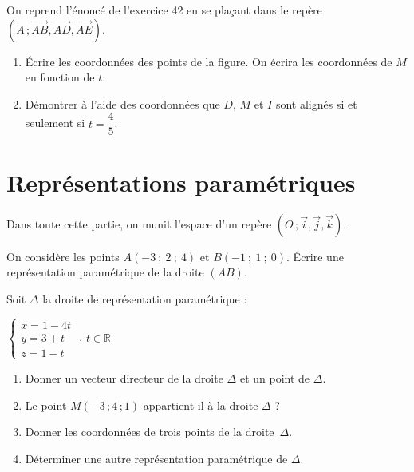 \documentclass{cornouaille}
\begin{document}
\begin{exercice}
  On reprend l'énoncé de l'exercice 42 en se plaçant dans le repère
  $(A\,;\overrightarrow{AB},\overrightarrow{AD},\overrightarrow{AE})$.
  \begin{enumerate}
  \item Écrire les coordonnées des points de la figure. On écrira les
    coordonnées de $M$ en fonction de $t$.
  \item Démontrer à l'aide des coordonnées que $D$, $M$ et $I$ sont
    alignés si et seulement si $t=\dfrac{4}{5}$.
  \end{enumerate}
\end{exercice}

\section{Représentations paramétriques}

Dans toute cette partie, on munit l'espace d'un repère
$(O\,;\vec{i},\vec{j},\vec{k})$.

\begin{exercice}
  On considère les points $A(-3\ ;\ 2\ ;\ 4)$ et  $B(-1\ ;\ 1\ ;\ 0)$.
  Écrire une représentation paramétrique de la droite $(AB)$.
\end{exercice}

\begin{exercice}
  Soit $\Delta$ la droite de représentation paramétrique :
{\centering
  $\begin{cases}x=1-4t \\y=3+t \\z=1-t \end{cases}$ , $t\in\mathbb{R}$
\par}
\begin{enumerate}
\item Donner un vecteur directeur de la droite $\Delta$ et un point de
  $\Delta$.
\item Le point $M(-3\,;4\,;1)$ appartient-il à la droite $\Delta$ ?
\item Donner les coordonnées de trois points de la droite~$\Delta$.
\item Déterminer une autre représentation paramétrique de $\Delta$.
\end{enumerate}
\end{exercice}
\end{document}
